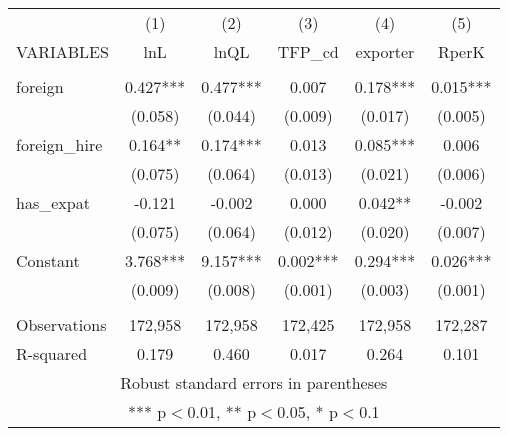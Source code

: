 \begin{tabular}{lccccc} \hline
 & (1) & (2) & (3) & (4) & (5) \\
VARIABLES & lnL & lnQL & TFP\_cd & exporter & RperK \\ \hline
 &  &  &  &  &  \\
foreign & 0.427*** & 0.477*** & 0.007 & 0.178*** & 0.015*** \\
 & (0.058) & (0.044) & (0.009) & (0.017) & (0.005) \\
foreign\_hire & 0.164** & 0.174*** & 0.013 & 0.085*** & 0.006 \\
 & (0.075) & (0.064) & (0.013) & (0.021) & (0.006) \\
has\_expat & -0.121 & -0.002 & 0.000 & 0.042** & -0.002 \\
 & (0.075) & (0.064) & (0.012) & (0.020) & (0.007) \\
Constant & 3.768*** & 9.157*** & 0.002*** & 0.294*** & 0.026*** \\
 & (0.009) & (0.008) & (0.001) & (0.003) & (0.001) \\
 &  &  &  &  &  \\
Observations & 172,958 & 172,958 & 172,425 & 172,958 & 172,287 \\
 R-squared & 0.179 & 0.460 & 0.017 & 0.264 & 0.101 \\ \hline
\multicolumn{6}{c}{ Robust standard errors in parentheses} \\
\multicolumn{6}{c}{ *** p$<$0.01, ** p$<$0.05, * p$<$0.1} \\
\end{tabular}
